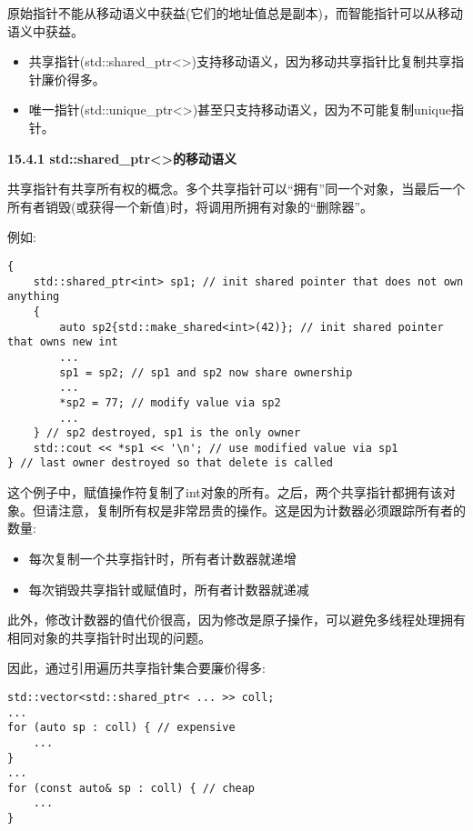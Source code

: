 原始指针不能从移动语义中获益(它们的地址值总是副本)，而智能指针可以从移动语义中获益。\par

\begin{itemize}
	\item 共享指针(std::shared\_ptr<>)支持移动语义，因为移动共享指针比复制共享指针廉价得多。
	\item 唯一指针(std::unique\_ptr<>)甚至只支持移动语义，因为不可能复制unique指针。
\end{itemize}

\hspace*{\fill} \par %
\textbf{15.4.1 std::shared\_ptr<>的移动语义}

共享指针有共享所有权的概念。多个共享指针可以“拥有”同一个对象，当最后一个所有者销毁(或获得一个新值)时，将调用所拥有对象的“删除器”。\par

例如:\par

\begin{lstlisting}[caption={}]
{
	std::shared_ptr<int> sp1; // init shared pointer that does not own anything
	{
		auto sp2{std::make_shared<int>(42)}; // init shared pointer that owns new int
		...
		sp1 = sp2; // sp1 and sp2 now share ownership
		...
		*sp2 = 77; // modify value via sp2
		...
	} // sp2 destroyed, sp1 is the only owner
	std::cout << *sp1 << '\n'; // use modified value via sp1
} // last owner destroyed so that delete is called
\end{lstlisting}

这个例子中，赋值操作符复制了int对象的所有。之后，两个共享指针都拥有该对象。但请注意，复制所有权是非常昂贵的操作。这是因为计数器必须跟踪所有者的数量:\par

\begin{itemize}
	\item 每次复制一个共享指针时，所有者计数器就递增
	\item 每次销毁共享指针或赋值时，所有者计数器就递减
\end{itemize}

此外，修改计数器的值代价很高，因为修改是原子操作，可以避免多线程处理拥有相同对象的共享指针时出现的问题。\par

因此，通过引用遍历共享指针集合要廉价得多:\par

\begin{lstlisting}[caption={}]
std::vector<std::shared_ptr< ... >> coll;
...
for (auto sp : coll) { // expensive
	...
}
...
for (const auto& sp : coll) { // cheap
	...
}
\end{lstlisting}

